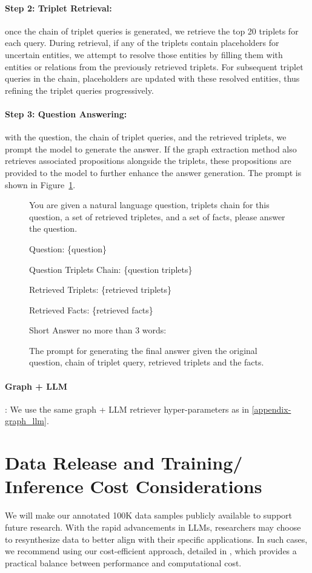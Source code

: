 \documentclass{article} %
\begin{document}
\paragraph{Step 2: Triplet Retrieval:}
once the chain of triplet queries is generated, we retrieve the top 20 triplets for each query. During retrieval, if any of the triplets contain placeholders for uncertain entities, we attempt to resolve those entities by filling them with entities or relations from the previously retrieved triplets. 
For subsequent triplet queries in the chain, placeholders are updated with these resolved entities, thus refining the triplet queries progressively.

\paragraph{Step 3: Question Answering:} with the question, the chain of triplet queries, and the retrieved triplets, we prompt the model to generate the answer. If the graph extraction method also retrieves associated propositions alongside the triplets, these propositions are provided to the model to further enhance the answer generation. The prompt is shown in Figure~\ref{fig:prompt-tripletqa}. 

\begin{figure}[!ht]
\tiny
\begin{mdframed}
You are given a natural language question, triplets chain for this question, a set of retrieved tripletes, and a set of facts, please answer the question.

Question: \{question\}

Question Triplets Chain:
\{question triplets\}

Retrieved Triplets:
\{retrieved triplets\}

Retrieved Facts:
\{retrieved facts\}

Short Answer no more than 3 words:
\end{mdframed}
\caption{The prompt for generating the final answer given the original question, chain of triplet query, retrieved triplets and the facts.}
\label{fig:prompt-tripletqa}
\end{figure}


\paragraph{Graph + LLM}: We use the same graph + LLM retriever hyper-parameters as in \cref{appendix-graph_llm}.


\section{Data Release and Training/ Inference Cost Considerations}
We will make our annotated 100K data samples publicly available to support future research. With the rapid advancements in LLMs, researchers may choose to resynthesize data to better align with their specific applications. In such cases, we recommend using our cost-efficient approach, detailed in , which provides a practical balance between performance and computational cost.
\end{document}
